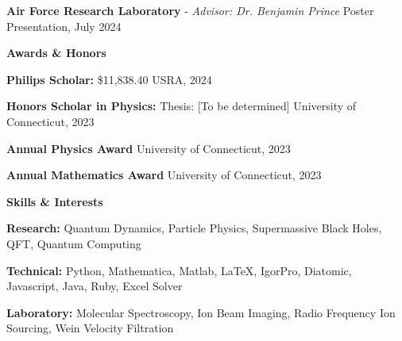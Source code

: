 \documentclass[11pt]{article}
\begin{document}
\textbf{Air Force Research Laboratory} - \textit{Advisor: Dr. Benjamin Prince} \hfill Poster Presentation, July 2024

\vspace{12pt}

\begin{center}
    \textbf{Awards \& Honors}
\end{center}

\textbf{Philips Scholar:} \$11,838.40 \hfill USRA, 2024

\textbf{Honors Scholar in Physics:} Thesis: [To be determined] \hfill University of Connecticut, 2023

\textbf{Annual Physics Award} \hfill University of Connecticut, 2023

\textbf{Annual Mathematics Award} \hfill University of Connecticut, 2023

\vspace{12pt}

\begin{center}
    \textbf{Skills \& Interests}
\end{center}

\textbf{Research:} Quantum Dynamics, Particle Physics, Supermassive Black Holes, QFT, Quantum Computing

\textbf{Technical:} Python, Mathematica, Matlab, LaTeX, IgorPro, Diatomic, Javascript, Java, Ruby, Excel Solver

\textbf{Laboratory:} Molecular Spectroscopy, Ion Beam Imaging, Radio Frequency Ion Sourcing, Wein Velocity Filtration
\end{document}
